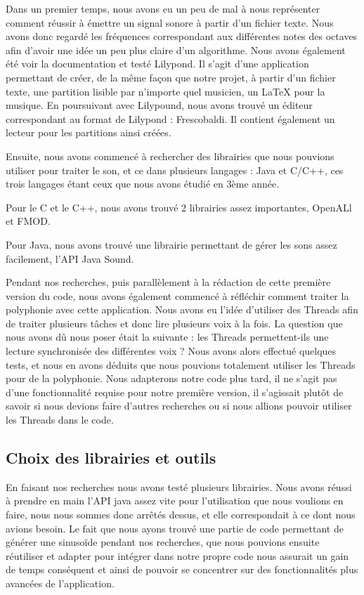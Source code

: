 \documentclass{EPUProjetPeiP}
\begin{document}
Dans un premier temps, nous avons eu un peu de mal à nous représenter comment réussir à émettre un signal sonore à partir d'un fichier texte. Nous avons donc regardé les fréquences correspondant aux différentes notes des octaves afin d'avoir une idée un peu plus claire d'un algorithme. Nous avons également été voir la documentation et testé Lilypond. Il s'agit d'une application permettant de créer, de la même façon que notre projet, à partir d'un fichier texte,  une partition lisible par n'importe quel musicien, un LaTeX pour la musique. En poursuivant avec Lilypound, nous avons trouvé un éditeur correspondant au format de Lilypond : Frescobaldi. Il contient également un lecteur pour les partitions ainsi créées.

Ensuite, nous avons commencé à rechercher des librairies que nous pouvions utiliser pour traiter le son, et ce dans plusieurs langages : Java et C/C++, ces trois langages étant ceux que nous avons étudié en 3ème année. 

Pour le C et le C++, nous avons trouvé 2 librairies assez importantes, OpenALl et FMOD.

Pour Java, nous avons trouvé une librairie permettant de gérer les sons assez facilement, l'API Java Sound.

Pendant nos recherches, puis parallèlement à la rédaction de cette première version du code, nous avons également commencé à réfléchir comment traiter la polyphonie avec cette application. Nous avons eu l'idée d'utiliser des Threads afin de traiter plusieurs tâches et donc lire plusieurs voix à la fois. La question que nous avons dû nous poser était la suivante : les Threads permettent-ils une lecture synchronisée des différentes voix ? Nous avons alors effectué quelques tests, et nous en avons déduits que nous pouvions totalement utiliser les Threads pour de la polyphonie. Nous adapterons notre code plus tard, il ne s'agit pas d'une fonctionnalité requise pour notre première version, il s'agissait plutôt de savoir si nous devions faire d'autres recherches ou si nous allions pouvoir utiliser les Threads dans le code.

\subsection{Choix des librairies et outils} 

En faisant nos recherches nous avons testé plusieurs librairies. Nous avons réussi à prendre en main l'API java assez vite pour l'utilisation que nous voulions en faire, nous nous sommes donc arrêtés dessus, et elle correspondait à ce dont nous avions besoin. Le fait que nous ayons trouvé une partie de code permettant de générer une sinusoïde pendant nos recherches, que nous pouvions ensuite réutiliser et adapter pour intégrer dans notre propre code nous assurait un gain de temps conséquent et ainsi de pouvoir se concentrer sur des fonctionnalités plus avancées de l'application.
\end{document}
